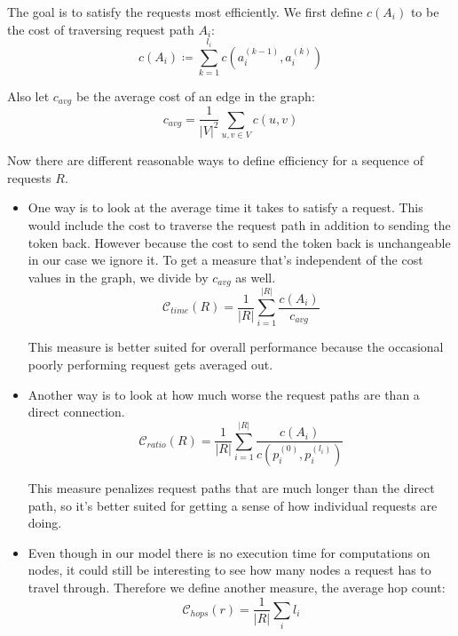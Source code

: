 \documentclass[a4paper, oneside]{discothesis}
\begin{document}
The goal is to satisfy the requests most efficiently. We first define $c(A_i)$ to be the cost of traversing request path $A_i$:
\begin{equation}
c(A_i)\coloneqq\sum_{k=1}^{l_i}c(a_i^{(k-1)}, a_i^{(k)})
\end{equation}

Also let $c_{avg}$ be the average cost of an edge in the graph:
\begin{equation}
c_{avg}=\frac{1}{|V|^2}\sum_{u,v\in V}c(u,v)
\end{equation}

Now there are different reasonable ways to define efficiency for a sequence of requests $R$.
\begin{itemize}
\item
  One way is to look at the average time it takes to satisfy a request. This would include the cost to traverse the request path in addition to sending the token back. However because the cost to send the token back is unchangeable in our case we ignore it. To get a measure that's independent of the cost values in the graph, we divide by $c_{avg}$ as well.
  \begin{equation}
    \mathcal{C}_{time}(R) = \frac{1}{|R|}\sum_{i=1}^{|R|}\frac{c(A_i)}{c_{avg}}
  \end{equation}

  This measure is better suited for overall performance because the occasional poorly performing request gets averaged out.
  
\item
  Another way is to look at how much worse the request paths are than a direct connection.
  \begin{equation}
    \mathcal{C}_{ratio}(R) = \frac{1}{|R|}\sum_{i=1}^{|R|}\frac{c(A_i)}{c(p_i^{(0)},p_i^{(l_i)})}
  \end{equation}

  This measure penalizes request paths that are much longer than the direct path, so it's better suited for getting a sense of how individual requests are doing.

\item
  Even though in our model there is no execution time for computations on nodes, it could still be interesting to see how many nodes a request has to travel through. Therefore we define another measure, the average hop count:
  \begin{equation}
    \mathcal{C}_{hops}(r) = \frac{1}{|R|}\sum_il_i
  \end{equation}
\end{itemize}
\end{document}
